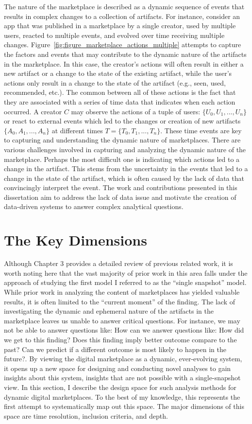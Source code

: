 The nature of the marketplace is described as a dynamic sequence of events that results in complex changes to a collection of artifacts.
For instance, consider an app that was published in a marketplace by a single creator, used by multiple users, reacted to multiple events, and evolved over time receiving multiple changes.
Figure~\ref{fig:figure_marketplace_actions_multiple} attempts to capture the factors and events that may contribute to the dynamic nature of the artifacts in the marketplace.
In this case, the creator's actions will often result in either a new artifact or a change to the state of the existing artifact, while the user's actions only result in a change to the state of the artifact (e.g., seen, used, recommended, etc.).
The common between all of these actions is the fact that they are associated with a series of time data that indicates when each action occurred.
A creator $C$ may observe the actions of a tuple of users: $\{U_0, U_1,..., U_n\}$ or react to external events which led to the changes or creation of new artifacts $\{A_0, A_1,..., A_n\}$ at different times $T=\{T_0, T_1,..., T_n\}$.
These time events are key to capturing and understanding the dynamic nature of marketplaces.
There are various challenges involved in capturing and analyzing the dynamic nature of the marketplace.
Perhaps the most difficult one is indicating which actions led to a change in the artifact.
This stems from the uncertainty in the events that led to a change in the state of the artifact, which is often caused by the lack of data that convincingly interpret the event.
The work and contributions presented in this dissertation aim to address the lack of data issue and motivate the creation of data-driven systems to answer complex analytical questions. 

\section{The Key Dimensions}
Although Chapter 3 provides a detailed review of previous related work, it is worth noting here that the vast majority of prior work in this area falls under the approach of studying the first model I referred to as the ``single snapshot'' model.
While prior work in analyzing the content of marketplaces has yielded valuable results, it is often limited to the ``current moment'' of the finding.
The lack of investigating the dynamic and ephemeral nature of the artifacts in the marketplace leaves us unable to answer critical questions. For instance, we may not be able to answer questions like: How can we answer questions like: How did we get to this finding? Does this finding imply better outcome compare to the past? Can we predict if a different outcome is most likely to happen in the future?.
By viewing the digital marketplace as a dynamic, ever-evolving system, it opens up a new space for designing and conducting novel analyses to gain insights about this system, insights that are not possible with a single-snapshot view.
In this section, I describe the design space for such analysis methods for dynamic digital marketplaces.
To the best of my knowledge, this represents the first attempt to systematically map out this space.
The major dimensions of this space are time resolution, inclusion criteria, and depth.

